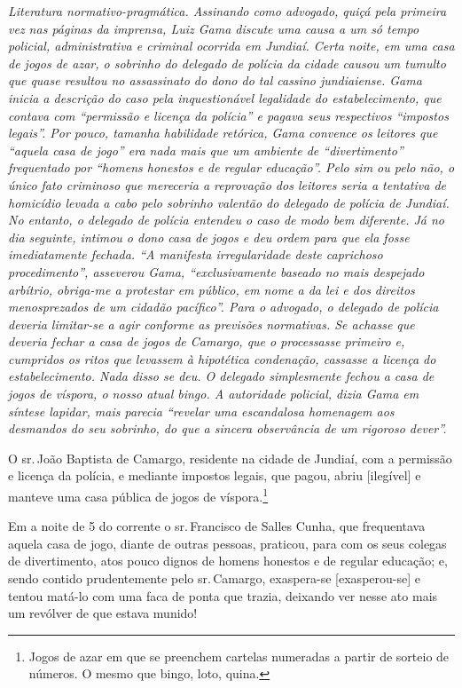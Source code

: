 \begin{didascalia}
\emph{Literatura normativo-pragmática. Assinando como advogado, quiçá
pela primeira vez nas páginas da imprensa, Luiz Gama discute uma causa a
um só tempo policial, administrativa e criminal ocorrida em Jundiaí.
Certa noite, em uma casa de jogos de azar, o sobrinho do delegado de
polícia da cidade causou um tumulto que quase resultou no assassinato do
dono do tal cassino jundiaiense. Gama inicia a descrição do caso pela
inquestionável legalidade do estabelecimento, que contava com ``permissão
e licença da polícia'' e pagava seus respectivos ``impostos legais''. Por
pouco, tamanha habilidade retórica, Gama convence os leitores que
``aquela casa de jogo'' era nada mais que um ambiente de ``divertimento''
frequentado por ``homens honestos e de regular educação''. Pelo sim ou
pelo não, o único fato criminoso que mereceria a reprovação dos leitores
seria a tentativa de homicídio levada a cabo pelo sobrinho valentão do
delegado de polícia de Jundiaí. No entanto, o delegado de polícia
entendeu o caso de modo bem diferente. Já no dia seguinte, intimou o
dono casa de jogos e deu ordem para que ela fosse imediatamente fechada.
``A manifesta irregularidade deste caprichoso procedimento'', asseverou
Gama, ``exclusivamente baseado no mais despejado arbítrio, obriga-me a
protestar em público, em nome a da lei e dos direitos menosprezados de
um cidadão pacífico''. Para o advogado, o delegado de polícia deveria
limitar-se a agir conforme as previsões normativas. Se achasse que
deveria fechar a casa de jogos de Camargo, que o processasse primeiro e,
cumpridos os ritos que levassem à hipotética condenação, cassasse a
licença do estabelecimento. Nada disso se deu. O delegado simplesmente
fechou a casa de jogos de víspora, o nosso atual bingo. A autoridade
policial, dizia Gama em síntese lapidar, mais parecia ``revelar uma
escandalosa homenagem aos desmandos do seu sobrinho, do que a sincera
observância de um rigoroso dever''.}
\end{didascalia}

O sr.\,João Baptista de Camargo, residente na cidade de Jundiaí, com a
permissão e licença da polícia, e mediante impostos legais, que pagou,
abriu {[}ilegível{]} e manteve uma casa pública de jogos de
víspora.\footnote{ Jogos de azar em que se preenchem cartelas numeradas
  a partir de sorteio de números. O mesmo que bingo, loto, quina.}

Em a noite de 5 do corrente o sr.\,Francisco de Salles Cunha, que
frequentava aquela casa de jogo, diante de outras pessoas, praticou,
para com os seus colegas de divertimento, atos pouco dignos de homens
honestos e de regular educação; e, sendo contido prudentemente pelo sr.\,Camargo, exaspera-se {[}exasperou-se{]} e tentou matá-lo com uma faca de
ponta que trazia, deixando ver nesse ato mais um revólver de que estava
munido!

